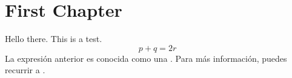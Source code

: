 \documentclass[../main.tex]{subfiles}
\begin{document}
    \newrefsection
    \chapter{First Chapter}
    Hello there. This is a test.
    \begin{equation}
        \label{eq:chap1:1}
        p + q = 2r
    \end{equation}
    La expresión anterior es conocida como una . Para más información, 
    puedes recurrir a \cite{jech06}.
    \printbibliography
\end{document}
